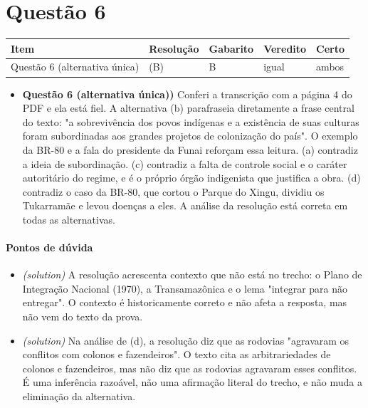 \documentclass{article}%
\begin{document}
\section*{Questão 6}%
\begin{longtable}{@{}p{} p{} p{} p{} p{}@{}}\toprule Item & Resolução & Gabarito & Veredito & Certo \\ \midrule
Questão 6 (alternativa única) & (B) & B & igual & ambos \\
\bottomrule\end{longtable}%
\begin{itemize}%
\item%
\textbf{Questão 6 (alternativa única))} Conferi a transcrição com a página 4 do PDF e ela está fiel. A alternativa (b) parafraseia diretamente a frase central do texto: "a sobrevivência dos povos indígenas e a existência de suas culturas foram subordinadas aos grandes projetos de colonização do país". O exemplo da BR{-}80 e a fala do presidente da Funai reforçam essa leitura. (a) contradiz a ideia de subordinação. (c) contradiz a falta de controle social e o caráter autoritário do regime, e é o próprio órgão indigenista que justifica a obra. (d) contradiz o caso da BR{-}80, que cortou o Parque do Xingu, dividiu os Tukarramãe e levou doenças a eles. A análise da resolução está correta em todas as alternativas.%
\end{itemize}%
\paragraph{Pontos de dúvida}%
\begin{itemize}%
\item%
\textit{(solution)} A resolução acrescenta contexto que não está no trecho: o Plano de Integração Nacional (1970), a Transamazônica e o lema "integrar para não entregar". O contexto é historicamente correto e não afeta a resposta, mas não vem do texto da prova.%
\item%
\textit{(solution)} Na análise de (d), a resolução diz que as rodovias "agravaram os conflitos com colonos e fazendeiros". O texto cita as arbitrariedades de colonos e fazendeiros, mas não diz que as rodovias agravaram esses conflitos. É uma inferência razoável, não uma afirmação literal do trecho, e não muda a eliminação da alternativa.%
\end{itemize}%
\end{document}
